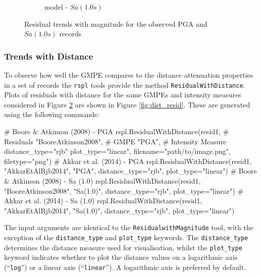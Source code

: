 \begin{figure}[htb]
\begin{subfigure}[b]{0.49\textwidth}
     \caption{\textcite{Akkar_etal2014} model - $Sa \left( {1.0 s} \right)$}
      \label{fig:sa1_mag_akkar2014}
  \end{subfigure}
  \caption{Residual trends with magnitude for the observed PGA and $Sa \left( {1.0 s} \right)$ records}
  \label{fig:mag_resid}
\end{figure}


\subsubsection{Trends with Distance}

To observe how well the GMPE compares to the distance attenuation properties in a set of records the \verb=rspl= tools provide the method \verb=ResidualWithDistance=. Plots of residuals with distance for the same GMPEs and intensity measures considered in Figure \ref{fig:mag_resid} are shown in Figure \ref{fig:dist_resid}. These are generated using the following commands:

\begin{python}[frame=single]
# Boore & Atkinson (2008)  - PGA
rspl.ResidualWithDistance(resid1,  # Residuals
                           "BooreAtkinson2008",  # GMPE
                           "PGA",   # Intensity Measure
                           distance_type="rjb"
                           plot_type="linear",
                           filename="path/to/image.png",
                           filetype="png")
# Akkar et al. (2014)  - PGA
rspl.ResidualWithDistance(resid1, "AkkarEtAlRjb2014",
                          "PGA", distance_type="rjb",
                          plot_type="linear") 
# Boore & Atkinson (2008)  - Sa (1.0)
rspl.ResidualWithDistance(resid1, "BooreAtkinson2008",
                          "Sa(1.0)", distance_type="rjb",
                          plot_type="linear") 
# Akkar et al. (2014)  - Sa (1.0)
rspl.ResidualWithDistance(resid1, "AkkarEtAlRjb2014",
                          "Sa(1.0)", distance_type="rjb",
                          plot_type="linear")                         
\end{python}

The input arguments are identical to the \verb=ResidualwithMagnitude= tool, with the exception of the \verb=distance_type= and \verb=plot_type= keywords. The \verb=distance_type= determines the distance measure used for visualisation, whilst the \verb=plot_type= keyword indicates whether to plot the distance values on a logarithmic axis (``\verb=log='') or a linear axis (``\verb=linear=''). A logarithmic axis is preferred by default.

